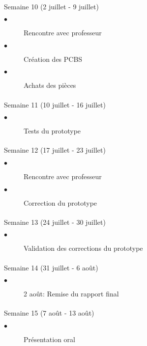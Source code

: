 		
		\paragraph{}
		Semaine 10 (2 juillet - 9 juillet)
			\begin{description}
				\item[$\bullet$] Rencontre avec professeur
				\item[$\bullet$] Création des PCBS
				\item[$\bullet$] Achats des pièces				
			\end{description}		
		
		\paragraph{}
		Semaine 11 (10 juillet - 16 juillet)
			\begin{description}
				\item[$\bullet$] Tests du prototype
			\end{description}

			
		\paragraph{}
		Semaine 12 (17 juillet - 23 juillet)
			\begin{description}
				\item[$\bullet$] Rencontre avec professeur
				\item[$\bullet$] Correction du prototype				
			\end{description}		
		
		\paragraph{}
		Semaine 13 (24 juillet - 30 juillet)
			\begin{description}
				\item[$\bullet$] Validation des corrections du prototype
			\end{description}
		
		\paragraph{}
		Semaine 14 (31 juillet - 6 août)
			\begin{description}
				\item[$\bullet$] 2 août: Remise du rapport final
			\end{description}	
			
		\paragraph{}
		Semaine 15 (7 août - 13 août)
			\begin{description}		
				\item[$\bullet$] Présentation oral
			\end{description}	